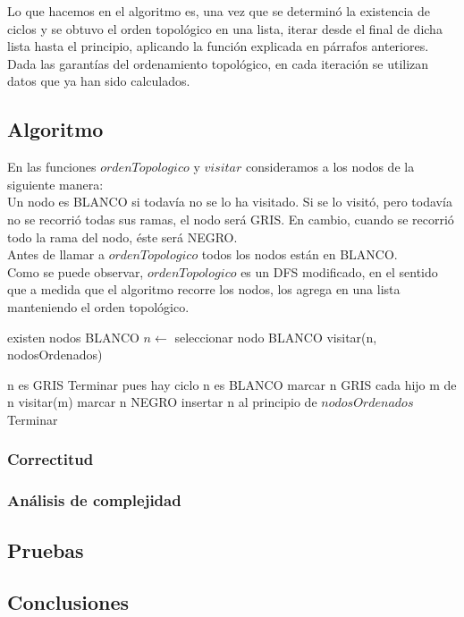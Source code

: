 \quad Lo que hacemos en el algoritmo es, una vez que se determinó la existencia de ciclos y se obtuvo el orden topológico en una lista, iterar desde el final de dicha lista hasta el principio, aplicando la función explicada en párrafos anteriores. Dada las garantías del ordenamiento topológico, en cada iteración se utilizan datos que ya han sido calculados.



 

\subsection{Algoritmo}

\indent En las funciones $ordenTopologico$ y $visitar$ consideramos a los nodos de la siguiente manera:\\
\indent Un nodo es BLANCO si todavía no se lo ha visitado. Si se lo visitó, pero todavía no se recorrió todas sus ramas, el nodo será GRIS. En cambio, cuando se recorrió todo la rama del nodo, éste será NEGRO.\\
\indent Antes de llamar a $ordenTopologico$ todos los nodos están en BLANCO. \\
\indent Como se puede observar, $ordenTopologico$ es un DFS modificado, en el sentido que a medida que el algoritmo recorre los nodos, los agrega en una lista manteniendo el orden topológico.\\


\begin{algorithm}[H]
\caption{} 
\begin{codebox}
\li \While existen nodos BLANCO \Do
\li	$n \gets$ seleccionar nodo BLANCO
\li	visitar(n, nodosOrdenados)

\End
\end{codebox}
\end{algorithm}


\begin{algorithm}[H]
\caption{} 
\begin{codebox}
\li \If n es GRIS \Do
\li 	 Terminar pues hay ciclo
\li \End
\li \If n es BLANCO \Do
\li 	marcar n GRIS
\li		\For cada hijo m de n \Do
\li			visitar(m)			
\li		\End
\li		marcar n NEGRO
\li 		insertar n al principio de $nodosOrdenados$
\li 		Terminar
\li \End

\End
\end{codebox}
\end{algorithm}
 

\subsubsection{Correctitud} 



\subsubsection{An\'alisis de complejidad}
 
 

\subsection{Pruebas}



\subsection{Conclusiones}
